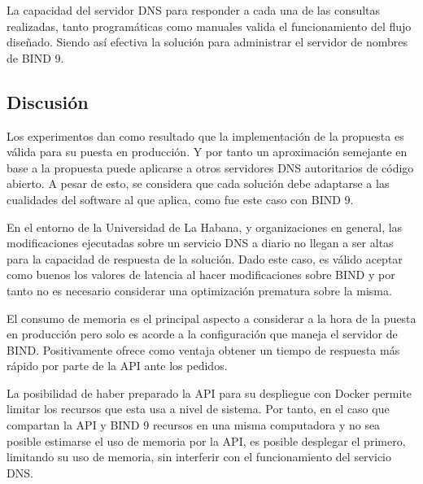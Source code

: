 La capacidad del servidor DNS para responder a cada una de las consultas realizadas, tanto programáticas como manuales valida el funcionamiento del flujo diseñado. Siendo así efectiva la solución para administrar el servidor de nombres de BIND 9.

\subsection{Discusión}

Los experimentos dan como resultado que la implementación de la propuesta es válida para su puesta en producción. Y por tanto un aproximación semejante en base a la propuesta puede aplicarse a otros servidores DNS autoritarios de código abierto. A pesar de esto, se considera que cada solución debe adaptarse a las cualidades del software al que aplica, como fue este caso con BIND 9.

En el entorno de la Universidad de La Habana, y organizaciones en general, las modificaciones ejecutadas sobre un servicio DNS a diario no llegan a ser altas para la capacidad de respuesta de la solución. Dado este caso, es válido aceptar como buenos los valores de latencia al hacer modificaciones sobre BIND y por tanto no es necesario considerar una optimización prematura sobre la misma.

El consumo de memoria es el principal aspecto a considerar a la hora de la puesta en producción pero solo es acorde a la configuración que maneja el servidor de BIND. Positivamente ofrece como ventaja obtener un tiempo de respuesta más rápido por parte de la API ante los pedidos.

La posibilidad de haber preparado la API para su despliegue con Docker permite limitar los recursos que esta usa a nivel de sistema. Por tanto, en el caso que compartan la API y BIND 9 recursos en una misma computadora y no sea posible estimarse el uso de memoria por la API, es posible desplegar el primero, limitando su uso de memoria, sin interferir con el funcionamiento del servicio DNS.
